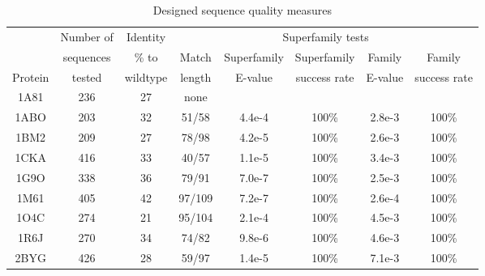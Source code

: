 {{\begin{table}[!htbp]                            
\caption{Designed sequence quality measures}
\small
\label{tab:quality}                      
\begin{center}
\begin{tabular}{cccccccc} \hline \hline  
        & Number of & Identity & \multicolumn{5}{c}{\hrulefill Superfamily tests \hrulefill}   \\
        & sequences & \% to    & Match & Superfamily & Superfamily  & Family  & Family        \\
Protein & tested    & wildtype & length & E-value     & success rate & E-value & success rate  \\ \hline
1A81    & 236       & 27       & none   &             &              &         &               \\
1ABO    & 203       & 32       & 51/58  & 4.4e-4      & 100\%        & 2.8e-3  & 100\%         \\
1BM2    & 209       & 27       & 78/98  & 4.2e-5      & 100\%        & 2.6e-3  & 100\%         \\
1CKA    & 416       & 33       & 40/57  & 1.1e-5      & 100\%        & 3.4e-3  & 100\%         \\
1G9O    & 338       & 36       & 79/91  & 7.0e-7      & 100\%        & 2.5e-3  & 100\%         \\
1M61    & 405       & 42       & 97/109 & 7.2e-7      & 100\%        & 2.6e-4  & 100\%         \\
1O4C    & 274       & 21       & 95/104 & 2.1e-4      & 100\%        & 4.5e-3  & 100\%         \\
1R6J    & 270       & 34       & 74/82  & 9.8e-6      & 100\%        & 4.6e-3  & 100\%         \\
2BYG    & 426       & 28       & 59/97  & 1.4e-5      & 100\%        & 7.1e-3  & 100\%         \\ \hline
\end{tabular}
\end{center}
\end{table}


}}
